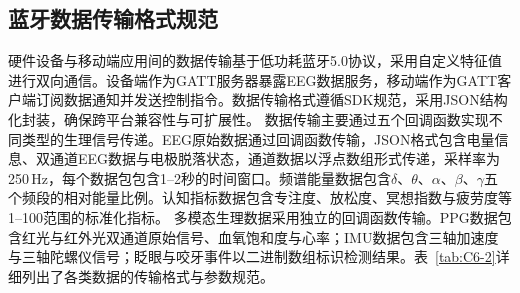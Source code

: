 


\subsection{蓝牙数据传输格式规范}

硬件设备与移动端应用间的数据传输基于低功耗蓝牙5.0协议，采用自定义特征值进行双向通信。设备端作为GATT服务器暴露EEG数据服务，移动端作为GATT客户端订阅数据通知并发送控制指令。数据传输格式遵循SDK规范，采用JSON结构化封装，确保跨平台兼容性与可扩展性。
数据传输主要通过五个回调函数实现不同类型的生理信号传递。EEG原始数据通过回调函数传输，JSON格式包含电量信息、双通道EEG数据与电极脱落状态，通道数据以浮点数组形式传递，采样率为250\,Hz，每个数据包包含1--2秒的时间窗口。频谱能量数据包含$\delta$、$\theta$、$\alpha$、$\beta$、$\gamma$五个频段的相对能量比例。认知指标数据包含专注度、放松度、冥想指数与疲劳度等1--100范围的标准化指标。
多模态生理数据采用独立的回调函数传输。PPG数据包含红光与红外光双通道原始信号、血氧饱和度与心率；IMU数据包含三轴加速度与三轴陀螺仪信号；眨眼与咬牙事件以二进制数组标识检测结果。表~\ref{tab:C6-2}详细列出了各类数据的传输格式与参数规范。


